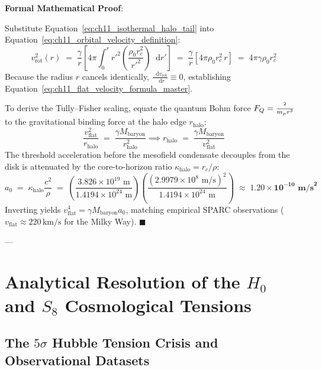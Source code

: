 \documentclass[
    12pt,
    a4paper,
    headings=normal,
    twoside=false,
    open=any,
    parskip=half
]{scrbook}
\let\hbar\relax
\newcommand{\diff}{\mathop{}\!\mathrm{d}}
\newenvironment{myproof}[1][]{%
  \par\vspace{6pt}\noindent\textbf{\sffamily\color{maincolor}Formal Mathematical Proof\ifstrempty{#1}{}{ (#1)}}:\par\nopagebreak
}{%
  \penalty50\hfill\ensuremath{\blacksquare}\par\vspace{6pt}
}
\begin{document}
\begin{myproof}
Substitute Equation~\eqref{eq:ch11_isothermal_halo_tail} into Equation~\eqref{eq:ch11_orbital_velocity_definition}:
\begin{equation*}
v_{\text{rot}}^2(r) \;=\; \frac{\gamma}{r} \left[ 4\pi \int_0^r r'^2 \left( \frac{\rho_0 r_c^2}{r'^2} \right) \diff r' \right] \;=\; \frac{\gamma}{r} \left[ 4\pi \rho_0 r_c^2 \, r \right] \;=\; 4\pi \gamma \rho_0 r_c^2
\end{equation*}
Because the radius $r$ cancels identically, $\frac{\diff v_{\text{rot}}}{\diff r} \equiv 0$, establishing Equation~\eqref{eq:ch11_flat_velocity_formula_master}.

To derive the Tully--Fisher scaling, equate the quantum Bohm force $F_Q = \frac{\hbar^2}{m_\mu r^3}$ to the gravitational binding force at the halo edge $r_{\text{halo}}$:
\begin{equation*}
\frac{v_{\text{flat}}^2}{r_{\text{halo}}} \;=\; \frac{\gamma M_{\text{baryon}}}{r_{\text{halo}}^2} \implies r_{\text{halo}} \;=\; \frac{\gamma M_{\text{baryon}}}{v_{\text{flat}}^2}
\end{equation*}
The threshold acceleration before the mesofield condensate decouples from the disk is attenuated by the core-to-horizon ratio $\kappa_{\text{halo}} = r_c / \rho$:
\begin{equation*}
a_0 \;=\; \kappa_{\text{halo}} \frac{c^2}{\rho} \;=\; \left( \frac{3.826 \times 10^{19} \text{ m}}{1.4194 \times 10^{24} \text{ m}} \right) \left( \frac{(2.9979 \times 10^8 \text{ m/s})^2}{1.4194 \times 10^{24} \text{ m}} \right) \;\approx\; \mathbf{1.20 \times 10^{-10} \text{ m/s}^2}
\end{equation*}
Inverting yields $v_{\text{flat}}^4 = \gamma M_{\text{baryon}} a_0$, matching empirical SPARC observations ($v_{\text{flat}} \approx 220\,\text{km/s}$ for the Milky Way).
\end{myproof}

---

\section{Analytical Resolution of the $H_0$ and $S_8$ Cosmological Tensions}
\label{sec:ch11_resolution_hubble_s8_tensions}

\subsection{The $5\sigma$ Hubble Tension Crisis and Observational Datasets}
\end{document}
